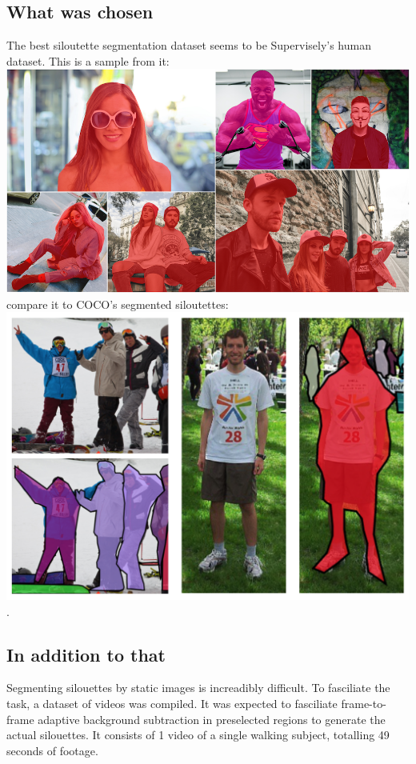 \documentclass{article}
\begin{document}
\subsection{What was chosen}
The best siloutette segmentation dataset seems to be Supervisely's human dataset\cite{supervisely}. This is a sample from it:
\\
\includegraphics[height=0.5\textwidth]{../img/supervisely}
\\
compare it to COCO's segmented siloutettes:
\\
\includegraphics[height=0.5\textheight]{../img/coco}.

\subsection{In addition to that}
Segmenting silouettes by static images is increadibly difficult.
To fasciliate the task, a dataset of videos was compiled.
It was expected to fasciliate frame-to-frame adaptive background subtraction in preselected regions to generate the actual silouettes.
It consists of 1 video of a single walking subject, totalling 49 seconds of footage.
\end{document}
